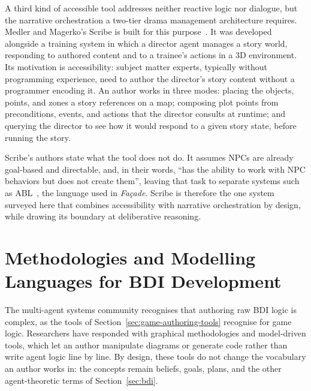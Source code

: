 A third kind of accessible tool addresses neither reactive logic nor dialogue, but the narrative orchestration a two-tier drama management architecture requires. Medler and Magerko's Scribe is built for this purpose~\cite{Medler2006}. It was developed alongside a training system in which a director agent manages a story world, responding to authored content and to a trainee's actions in a 3D environment. Its motivation is accessibility: subject matter experts, typically without programming experience, need to author the director's story content without a programmer encoding it. An author works in three modes: placing the objects, points, and zones a story references on a map; composing plot points from preconditions, events, and actions that the director consults at runtime; and querying the director to see how it would respond to a given story state, before running the story.
 
Scribe's authors state what the tool does not do. It assumes NPCs are already goal-based and directable, and, in their words, ``has the ability to work with NPC behaviors but does not create them'', leaving that task to separate systems such as ABL~\cite{Mateas2002}, the language used in \textit{Fa\c{c}ade}. Scribe is therefore the one system surveyed here that combines accessibility with narrative orchestration by design, while drawing its boundary at deliberative reasoning.


 
\section{Methodologies and Modelling Languages for BDI Development}
\label{sec:bdi-tools}
 
 
The multi-agent systems community recognises that authoring raw BDI logic is complex, as the tools of Section~\ref{sec:game-authoring-tools} recognise for game logic. Researchers have responded with graphical methodologies and model-driven tools, which let an author manipulate diagrams or generate code rather than write agent logic line by line. By design, these tools do not change the vocabulary an author works in: the concepts remain beliefs, goals, plans, and the other agent-theoretic terms of Section~\ref{sec:bdi}.
 

